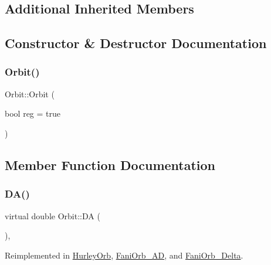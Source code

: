 \subsection*{Additional Inherited Members}


\subsection{Constructor \& Destructor Documentation}
\mbox{\label{class_orbit_af2f3481e19182fd2913fede508e0c685}} 
\subsubsection{\texorpdfstring{Orbit()}{Orbit()}}
{\footnotesize\ttfamily Orbit\+::\+Orbit (\begin{DoxyParamCaption}\item[{bool}]{reg = {\ttfamily true} }\end{DoxyParamCaption})\hspace{0.3cm}{\ttfamily [inline]}}



\subsection{Member Function Documentation}
\mbox{\label{class_orbit_a258deda1207d23b2ce6285b55e216d4f}} 
\subsubsection{\texorpdfstring{D\+A()}{DA()}}
{\footnotesize\ttfamily virtual double Orbit\+::\+DA (\begin{DoxyParamCaption}{ }\end{DoxyParamCaption})\hspace{0.3cm}{\ttfamily [inline]}, {\ttfamily [virtual]}}



Reimplemented in \hyperlink{class_hurley_orb_af4ef7b4bd24e22e010b96f7bc6d872f6}{Hurley\+Orb}, \hyperlink{class_fani_orb___a_d_a9df0d91b4d07869b53c894da8d60ba14}{Fani\+Orb\+\_\+\+AD}, and \hyperlink{class_fani_orb___delta_ad61e16d6c8f9a2b11940bc21d1362e9c}{Fani\+Orb\+\_\+\+Delta}.

\mbox{\label{class_orbit_a9bac8077719791b75d0c962428f8e1b4}} 
